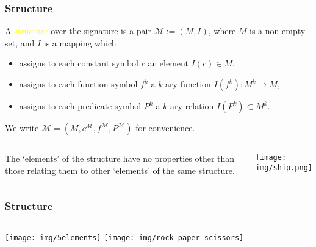 \documentclass[UTF8,aspectratio=43,11pt,colorlinks,compress,openany]{beamer}%
\begin{document}
\begin{frame}\frametitle{Structure}
		A \textcolor{yellow}{structure} over the signature is a pair $\mathcal{M}:=(M,I)$, where $M$ is a non-empty set, and $I$ is a mapping which
		\begin{itemize}
			\item assigns to each constant symbol $c$ an element $I(c)\in M$,
			\item assigns to each function symbol $f^k$ a $k$-ary function $I(f^k): M^k\to M$,
			\item assigns to each predicate symbol $P^k$ a $k$-ary relation $I(P^k)\subset M^k$.
		\end{itemize}
		We write $\mathcal{M}=\left(M,c^{\mathcal{M}},f^{\mathcal{M}},P^{\mathcal{M}}\right)$ for convenience.
		\begin{columns}
				\begin{block}{}
					The `elements' of the structure have no properties other than those relating them to other `elements' of the same structure.
				\end{block}
				\centering\texttt{[image: img/ship.png]}
		\end{columns}
\end{frame}

\begin{frame}\frametitle{Structure}
		\begin{columns}[onlytextwidth]
		\column{.45\textwidth}
		\texttt{[image: img/5elements]}
		\column{.45\textwidth}
		\texttt{[image: img/rock-paper-scissors]}
		\end{columns}\vspace{-7ex}
				\begin{center}
				\end{center}
\end{frame}
\end{document}
